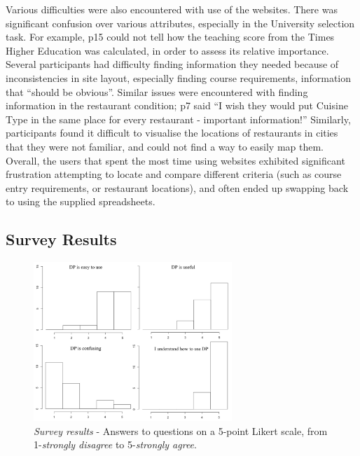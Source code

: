 \documentclass{sigchi}
\begin{document}

Various difficulties were also encountered with use of the websites. There was significant confusion over various attributes, especially in the University selection task.  For example, p15 could not tell how the teaching score from the Times Higher Education was calculated, in order to assess its relative importance.  Several participants had difficulty finding information they needed because of inconsistencies in site layout, especially finding course requirements, information that ``should be obvious''.  Similar issues were encountered with finding information in the restaurant condition; p7 said ``I wish they would put Cuisine Type in the same place for every restaurant - important information!'' Similarly, participants found it difficult to visualise the locations of restaurants in cities that they were not familiar, and could not find a way to easily map them. Overall, the users that spent the most time using websites exhibited significant frustration attempting to locate and compare different criteria (such as course entry requirements, or restaurant locations), and often ended up swapping back to using the supplied spreadsheets.



\subsection{Survey Results}


\begin{figure}[tbp]
\begin{center}
\includegraphics[width=7.5cm]{img/survey}
\caption{\emph{Survey results} - Answers to questions on a 5-point Likert scale, from 1-\emph{strongly disagree} to 5-\emph{strongly agree}.}
\label{fig:survey}
\end{center}
\end{figure}
\end{document}
